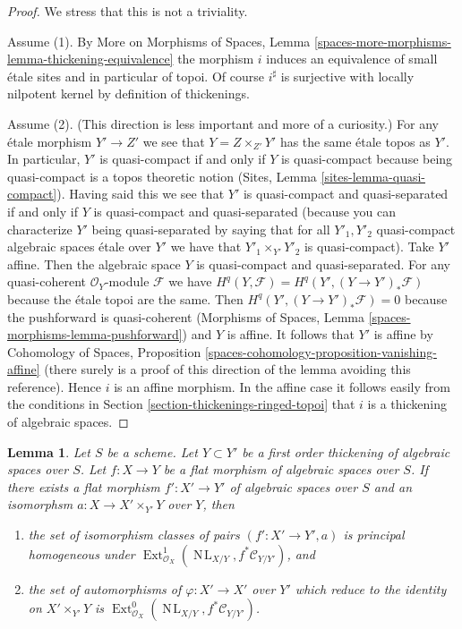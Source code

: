 \documentclass{stacks-project}
\theoremstyle{plain}
\newtheorem{lemma}[subsection]{Lemma}
\theoremstyle{definition}
\theoremstyle{remark}
\numberwithin{equation}{subsection}
\def\Ext{\mathop{\mathrm{Ext}}\nolimits}
\def\NL{\mathop{N\!L}\nolimits}
\begin{document}
\begin{proof}
We stress that this is not a triviality.

\medskip\noindent
Assume (1). By More on Morphisms of Spaces, Lemma
\ref{spaces-more-morphisms-lemma-thickening-equivalence}
the morphism $i$ induces an equivalence of small \'etale
sites and in particular of topoi. Of course $i^\sharp$
is surjective with locally nilpotent kernel by definition
of thickenings.

\medskip\noindent
Assume (2). (This direction is less important and more of
a curiosity.) For any \'etale morphism $Y' \to Z'$ we see
that $Y = Z \times_{Z'} Y'$ has the same \'etale topos
as $Y'$. In particular, $Y'$ is quasi-compact if and only if
$Y$ is quasi-compact because being quasi-compact
is a topos theoretic notion (Sites, Lemma \ref{sites-lemma-quasi-compact}).
Having said this we see that $Y'$ is quasi-compact and quasi-separated
if and only if $Y$ is quasi-compact and quasi-separated
(because you can characterize $Y'$ being quasi-separated by saying
that for all $Y'_1, Y'_2$ quasi-compact algebraic spaces \'etale over $Y'$
we have that $Y'_1 \times_{Y'} Y'_2$ is quasi-compact).
Take $Y'$ affine. Then the algebraic space $Y$ is
quasi-compact and quasi-separated. For any
quasi-coherent $\mathcal{O}_Y$-module $\mathcal{F}$ we have
$H^q(Y, \mathcal{F}) = H^q(Y', (Y \to Y')_*\mathcal{F})$
because the \'etale topoi are the same.
Then $H^q(Y', (Y \to Y')_*\mathcal{F}) = 0$
because the pushforward is quasi-coherent
(Morphisms of Spaces, Lemma \ref{spaces-morphisms-lemma-pushforward})
and $Y$ is affine. It follows that $Y'$ is affine by
Cohomology of Spaces, Proposition
\ref{spaces-cohomology-proposition-vanishing-affine}
(there surely is a proof of this direction of the lemma
avoiding this reference).
Hence $i$ is an affine morphism. In the affine case it
follows easily from the conditions in
Section \ref{section-thickenings-ringed-topoi}
that $i$ is a thickening of algebraic spaces.
\end{proof}

\begin{lemma}
\label{lemma-deform-spaces}
Let $S$ be a scheme.
Let $Y \subset Y'$ be a first order thickening of algebraic spaces
over $S$.
Let $f : X \to Y$ be a flat morphism of algebraic spaces over $S$.
If there exists a flat morphism $f' : X' \to Y'$ of algebraic spaces over $S$
and an isomorphsm $a : X \to X' \times_{Y'} Y$ over $Y$, then
\begin{enumerate}
\item the set of isomorphism classes of pairs $(f' : X' \to Y', a)$ is
principal homogeneous under
$\Ext^1_{\mathcal{O}_X}(\NL_{X/Y}, f^*\mathcal{C}_{Y/Y'})$, and
\item the set of automorphisms of $\varphi : X' \to X'$
over $Y'$ which reduce to the identity on $X' \times_{Y'} Y$
is $\Ext^0_{\mathcal{O}_X}(\NL_{X/Y}, f^*\mathcal{C}_{Y/Y'})$.
\end{enumerate}
\end{lemma}
\end{document}
